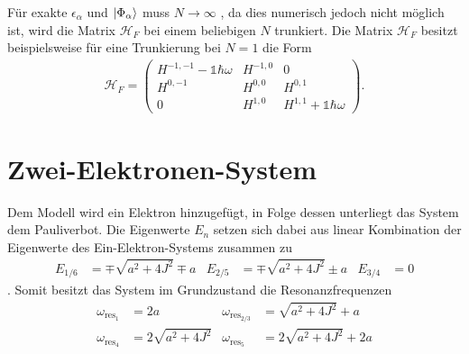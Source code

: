 Für exakte $\epsilon_{\alpha}$ und $\ket{\Phi_\alpha}$ muss
$N\rightarrow\infty $
, da
dies numerisch jedoch nicht möglich ist, wird die Matrix $\mathcal{H}_F$ bei einem beliebigen $N$ trunkiert.
Die Matrix $\mathcal{H}_F$ besitzt beispielsweise für eine Trunkierung bei $N=1$ die Form
\begin{align}
  \mathcal{H}_F=\begin{pmatrix}
  H^{-1,-1}-\mathbb{1}\hbar\omega &  H^{-1,0} &   0 \\
  H^{0,-1}               &  H^{0,0}  &H^{0,1}                  \\
      0                  &  H^{1,0}  & H^{1,1}+\mathbb{1}\hbar\omega
\end{pmatrix}.
\end{align}

\section{Zwei-Elektronen-System}
Dem Modell wird ein Elektron hinzugefügt, in Folge dessen unterliegt das System dem Pauliverbot.
Die Eigenwerte $E_n$ setzen sich dabei aus
linear Kombination der Eigenwerte
des Ein-Elektron-Systems \cite{philip}
zusammen zu
\begin{align}
E_{1/6}&=\mp\sqrt{a^2+4J^2}\mp a
&E_{2/5}&=\mp\sqrt{a^2+4J^2}\pm a
&E_{3/4}&=0
\end{align}.
Somit besitzt das System im Grundzustand die Resonanzfrequenzen
\begin{align}
\omega_{\text{res}_1}&=2a
&\omega_{\text{res}_{2/3}}&=\sqrt{a^2+4J^2}+a \\
\omega_{\text{res}_4}&=2\sqrt{a^2+4J^2}
&\omega_{\text{res}_5}&=2\sqrt{a^2+4J^2}+2a
\end{align}
